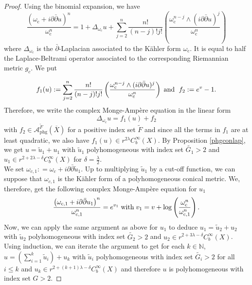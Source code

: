 \documentclass[a4paper,11pt]{article}
\def\N{\mathbb{N}}
\begin{document}
\begin{proof}
Using the binomial expansion, we have 
$$
\frac{\left(\omega_{\mathrm{c}}+i \partial \bar{\partial} u\right)^n}{\omega_{\mathrm{c}}^n} = 1+\Delta_{\omega_{\mathrm{c}}} u+\sum_{j=2}^n \frac{n!}{(n-j)!j!}\left(\frac{\omega_{\mathrm{c}}^{n-j} \wedge(i \partial \bar{\partial} u)^j}{\omega_{\mathrm{c}}^n}\right)
$$
where $\Delta_{\omega_{ c}}$ is the $\bar{\partial}$-Laplacian associated to the Kähler form $\omega_{\mathrm{c}}$. It is equal to half the Laplace-Beltrami operator associated to the corresponding Riemannian metric $g_c$. We put 

$$f_1(u):=\sum_{j=2}^n \frac{n!}{(n-j)!j!}\left(\frac{\omega_{\mathrm{c}}^{n-j} \wedge(i \partial \bar{\partial} u)^j}{\omega_{\mathrm{c}}^n}\right) \hspace{0.1cm} \text{and  } \hspace{0.1cm} f_2:=e^v - 1.$$
Therefore, we write the complex Monge-Ampère equation in the linear form 
$$\Delta_{\omega_{ c}} u = f_1(u) + f_2$$
with 
$f_2 \in \mathcal{A}_{\mathrm{phg}}^{\widetilde{F}}(\overline{X})$ for a positive index set $\widetilde{F}$ and since all the terms in $f_1$ are at least quadratic, we also have $f_1(u) \in r^{2 \lambda} C_b^{\infty}(X)$. By Proposition \ref{phgconlap}, we get $u=\tilde u_1 + u_1$ with $\tilde u_1$ polyhomogeneous with index set $\widetilde{G_1} >  2$ and $u_1 \in r^{2 + 2 \lambda - \delta} C_b^{\infty}(X) $ for $\delta = \frac{\lambda}{2}$. \\
We set $\omega_{ c, 1} : = \omega_{ c} + i \partial \bar{\partial} \tilde u_1  $. Up to multiplying $\tilde u_1$ by a cut-off function, we can suppose that $\omega_{ c, 1}$ is the Kähler form of a polyhomogeneous conical metric. We, therefore, get the following complex Monge-Ampère equation for $u_1$ 
$$
\frac{\left(\omega_{\mathrm{c,1}}+i \partial \bar{\partial} u_1\right)^n}{\omega_{\mathrm{c,1}}^n}=e^{v_1} \hspace{0.1cm} \text{with} \hspace{0.1cm} v_1 = v + \log\left({\frac{\omega_{\mathrm{c}}^n}{\omega_{\mathrm{c,1}}^n}}\right).
$$
Now, we can apply the same argument as above for $u_1$ to deduce $u_1= \tilde u_2 + u_2$ with $\tilde u_2$ polyhomogeneous with index set $\widetilde{G_2} > 2$ and $u_2 \in r^{2 + 3 \lambda - \delta} C_b^{\infty}(X) $. \\
Using induction, we can iterate the argument to get for each $k \in \N $, 
$u=(\sum_{i=1}^k \tilde u_i) + u_k $ with $\tilde u_i$ polyhomogeneous with index set $\widetilde{G_i} > 2$ for all $i \leq k$ and $u_k \in r^{2+ (k+1) \lambda - \delta} C_b^{\infty}(X) $ and therefore $u$ is polyhomogeneous with index set $G > 2$.  
\end{proof}
\end{document}
